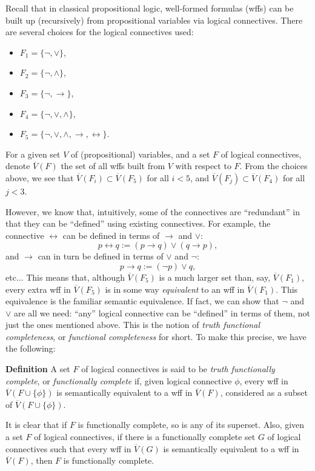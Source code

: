 \documentclass[12pt]{article}
\begin{document}
Recall that in classical propositional logic, well-formed formulas (wffs) can be built up (recursively) from propositional variables via logical connectives.  There are several choices for the logical connectives used:
\begin{itemize}
\item $F_1=\lbrace \neg, \vee \rbrace$,
\item $F_2=\lbrace \neg, \wedge \rbrace$,
\item $F_3=\lbrace \neg, \to \rbrace$,
\item $F_4=\lbrace \neg, \vee, \wedge \rbrace$,
\item $F_5=\lbrace \neg, \vee, \wedge, \to, \leftrightarrow \rbrace$.
\end{itemize}
For a given set $V$ of (propositional) variables, and a set $F$ of logical connectives, denote $\overline{V}(F)$ the set of all wffs built from $V$ with respect to $F$.  From the choices above, we see that $\overline{V}(F_i) \subset \overline{V}(F_5)$ for all $i<5$, and $\overline{V}(F_j) \subset \overline{V}(F_4)$ for all $j<3$.

However, we know that, intuitively, some of the connectives are ``redundant'' in that they can be ``defined'' using existing connectives.  For example, the connective $\leftrightarrow$ can be defined in terms of $\to$ and $\vee$: $$p\leftrightarrow q:= (p\to q)\vee (q\to p),$$ and $\to$ can in turn be defined in terms of $\vee$ and $\neg$: $$p\to q:= (\neg p) \vee q,$$ etc...  This means that, although $\overline{V}(F_5)$ is a much larger set than, say, $\overline{V}(F_1)$, every extra wff in $\overline{V}(F_5)$ is in some way \emph{equivalent} to an wff in $\overline{V}(F_1)$.  This equivalence is the familiar semantic equivalence.  If fact, we can show that $\neg$ and $\vee$ are all we need: ``any'' logical connective can be ``defined'' in terms of them, not just the ones mentioned above.  This is the notion of \emph{truth functional completeness}, or \emph{functional completeness} for short.  To make this precise, we have the following:

\textbf{Definition} A set $F$ of logical connectives is said to be \emph{truth functionally complete}, or \emph{functionally complete} if, given logical connective $\phi$, every wff in $\overline{V}(F \cup \lbrace \phi \rbrace)$ is semantically equivalent to a wff in $\overline{V}(F)$, considered as a subset of $\overline{V}(F \cup \lbrace \phi \rbrace)$.

It is clear that if $F$ is functionally complete, so is any of its superset.  Also, given a set $F$ of logical connectives, if there is a functionally complete set $G$ of logical connectives such that every wff in $\overline{V}(G)$ is semantically equivalent to a wff in $\overline{V}(F)$, then $F$ is functionally complete.
\end{document}

